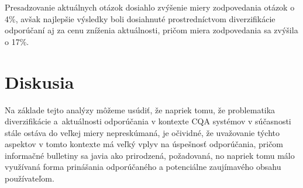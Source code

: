 Presadzovanie aktuálnych otázok dosiahlo zvýšenie miery zodpovedania otázok o 4\%, avšak najlepšie výsledky boli dosiahnuté
prostredníctvom diverzifikácie odporúčaní aj za cenu zníženia aktuálnosti, pričom miera zodpovedania sa zvýšila o 17\%.

\section{Diskusia}

Na základe tejto analýzy môžeme usúdiť, že napriek tomu, že problematika diverzifikácie a~aktuálnosti odporúčania v kontexte
CQA systémov v súčasnosti stále ostáva do veľkej miery nepreskúmaná, je očividné, že uvažovanie týchto aspektov v tomto
kontexte má veľký vplyv na úspešnosť odporúčania, pričom informačné bulletiny sa javia ako prirodzená, požadovaná,
no napriek tomu málo využívaná forma prinášania odporúčaného a potenciálne zaujímavého obsahu používateľom.
